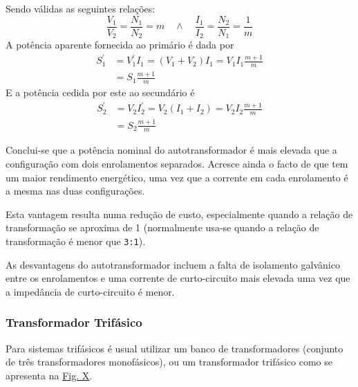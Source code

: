 \begin{minipage}[b]{0.55\linewidth}
    \begin{mdframed}
        Sendo válidas as seguintes relações:
        $$
                \frac{V_1}{V_2} = \frac{N_1}{N_2} = m 
                \quad\land\quad
                \frac{I_1}{I_2} = \frac{N_2}{N_1} = \frac{1}{m}
        $$
        A potência aparente fornecida ao primário é dada por
        $$
            \begin{aligned}
                S^{'}_1 &= V^{'}_1 I_1 = (V_1 + V_2) I_1 = V_1 I_1 \frac{m+1}{m} \\
                &= S_1 \frac{m+1}{m}
            \end{aligned}
        $$
        E a potência cedida por este ao secundário é
        $$
            \begin{aligned}
                S^{'}_2 &= V_2 I^{'}_2 = V_2 (I_1 + I_2) = V_2 I_2 \frac{m+1}{m} \\
                &= S_2 \frac{m+1}{m}
            \end{aligned}
        $$
    \end{mdframed}
\end{minipage}

\vspace{0.5em}
\noindent Conclui-se que a potência nominal do autotransformador é mais elevada que a configuração com dois enrolamentos separados. Acresce ainda o facto de que tem um maior rendimento energético, uma vez que a corrente em cada enrolamento é a mesma nas duas configurações.

Esta vantagem resulta numa redução de custo, especialmente quando a relação de transformação se aproxima de 1 (normalmente usa-se quando a relação de transformação é menor que \texttt{3:1})\cite{paiva2005}.

As desvantagens do autotransformador incluem a falta de isolamento galvânico entre os enrolamentos e uma corrente de curto-circuito mais elevada uma vez que a impedância de curto-circuito é menor.

\clearpage
\subsubsection{Transformador Trifásico}
\label{subsec:transformador-trifasico}

Para sistemas trifásicos é usual utilizar um banco de transformadores (conjunto de três transformadores monofásicos), ou um transformador trifásico como se apresenta na \hyperref[fig:transformador-trifasico]{Fig. X}.

